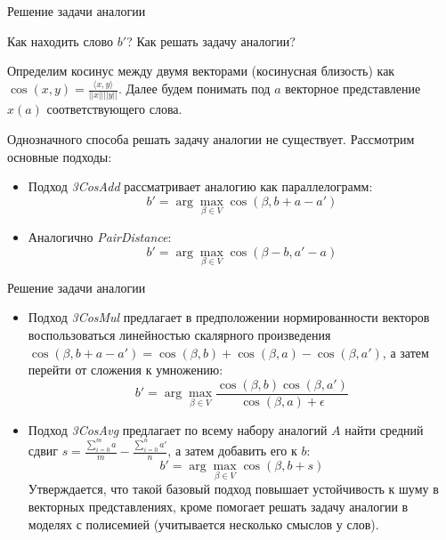 \documentclass[9pt]{beamer}
\begin{document}
\begin{frame}{Решение задачи аналогии}

Как находить слово $b'$? Как решать задачу аналогии?
\vspace{\baselineskip}

Определим косинус между двумя векторами (косинусная близость) как $\cos(x,y) = \frac{\langle x, y\rangle}{||x|| || y ||}$. Далее будем понимать под $a$ векторное представление $x(a)$ соответствующего слова.
\vspace{\baselineskip}

Однозначного способа решать задачу аналогии не существует. Рассмотрим основные подходы:

\begin{itemize}
    \item Подход \textit{3CosAdd} рассматривает аналогию как параллелограмм:
    \begin{equation}
    \label{3cosadd}
        b' = \arg \max_{\beta \in V} \cos(\beta, b + a - a')
    \end{equation}
    \item Аналогично \textit{PairDistance}:
    \begin{equation}
        b' = \arg \max_{\beta \in V} \cos(\beta - b, a' - a)
    \end{equation}
\end{itemize}
    
\end{frame}

\begin{frame}{Решение задачи аналогии}
\begin{itemize}
\item Подход \textit{3CosMul} предлагает в предположении нормированности векторов воспользоваться линейностью скалярного произведения $\cos(\beta, b + a - a') = \cos(\beta, b) + \cos(\beta, a) - \cos(\beta, a')$, а затем перейти от сложения к умножению:
    \begin{equation}
        b' = \arg \max_{\beta \in V} \dfrac{ \cos(\beta, b)\cos(\beta, a')}{\cos(\beta, a) + \epsilon}
    \end{equation}
    \item Подход \textit{3CosAvg} предлагает по всему набору аналогий $A$ найти средний сдвиг $s = \frac{\sum_{i = 0}^m a}{m} - \frac{\sum_{i = 0}^n a'}{n}$, а затем добавить его к $b$:
    \begin{equation}
        b' = \arg \max_{\beta \in V} \cos(\beta, b + s)
    \end{equation}
    Утверждается, что такой базовый подход повышает устойчивость к шуму в векторных представлениях, кроме помогает решать задачу аналогии в моделях с полисемией (учитывается несколько смыслов у слов).
\end{itemize}    
\end{frame}
\end{document}
